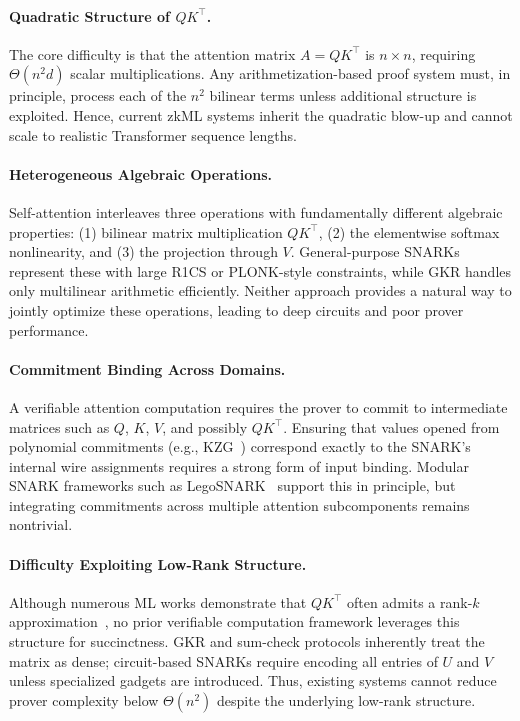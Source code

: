 \documentclass[11pt]{article}
\begin{document}
\paragraph{Quadratic Structure of $QK^\top$.}
The core difficulty is that the attention matrix $A = QK^\top$ is 
$n \times n$, requiring $\Theta(n^2 d)$ scalar multiplications.  
Any arithmetization-based proof system must, in principle, process 
each of the $n^2$ bilinear terms unless additional structure is exploited.  
Hence, current zkML systems inherit the quadratic blow-up and cannot 
scale to realistic Transformer sequence lengths.

\paragraph{Heterogeneous Algebraic Operations.}
Self-attention interleaves three operations with fundamentally 
different algebraic properties:
(1) bilinear matrix multiplication $QK^\top$,  
(2) the elementwise softmax nonlinearity, and  
(3) the projection through $V$.  
General-purpose SNARKs represent these with large R1CS or PLONK-style 
constraints, while GKR handles only multilinear arithmetic efficiently.  
Neither approach provides a natural way to jointly optimize these 
operations, leading to deep circuits and poor prover performance.

\paragraph{Commitment Binding Across Domains.}
A verifiable attention computation requires the prover to commit to 
intermediate matrices such as $Q$, $K$, $V$, and possibly $QK^\top$.  
Ensuring that values opened from polynomial commitments (e.g., KZG~\cite{kate2010polynomial}) 
correspond exactly to the SNARK's internal wire assignments requires a 
strong form of input binding.  
Modular SNARK frameworks such as LegoSNARK~\cite{campanelli2019legosnark} support 
this in principle, but integrating commitments across multiple attention 
subcomponents remains nontrivial.

\paragraph{Difficulty Exploiting Low-Rank Structure.}
Although numerous ML works demonstrate that $QK^\top$ often admits a 
rank-$k$ approximation~\cite{wang2020linformer,choromanski2021performer,
xiong2021nystromformer}, no prior verifiable computation framework 
leverages this structure for succinctness.  
GKR and sum-check protocols inherently treat the matrix as dense;  
circuit-based SNARKs require encoding all entries of $U$ and $V$ unless 
specialized gadgets are introduced.  
Thus, existing systems cannot reduce prover complexity below 
$\Theta(n^2)$ despite the underlying low-rank structure.
\end{document}
